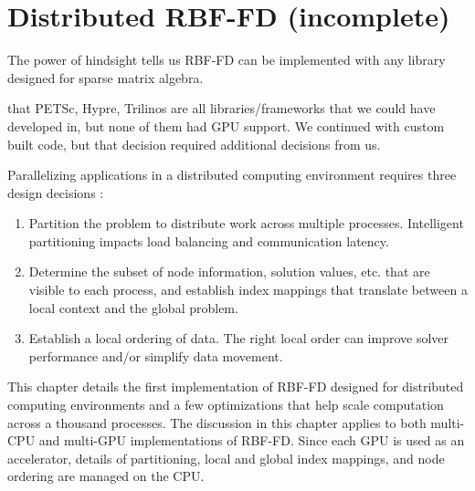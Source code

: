 \documentclass{report}
\begin{document}
\fi


\chapter{Distributed RBF-FD (incomplete)}
\label{chap:distributed_rbffd}



The power of hindsight tells us RBF-FD can be implemented with any library designed for sparse matrix algebra. 

 that PETSc, Hypre, Trilinos are all libraries/frameworks that we could have developed in, but none of them had GPU support. We continued with custom built code, but that decision required additional decisions from us. 

\cite{Yokota2010}
\cite{Yokota2012}
\cite{Schubert2011} 


Parallelizing applications in a distributed computing environment requires three
design decisions \cite{Saad2003}: 
\begin{enumerate} 
\item Partition the problem to distribute work across multiple processes. Intelligent partitioning
impacts load balancing and communication latency.
\item Determine the subset of node information,
solution values, etc. that are visible to each process, and establish index mappings that translate between a local context and the global problem. 
\item Establish a local ordering of data. The right local order can improve solver performance and/or simplify data movement. %
\end{enumerate}

This chapter details the first implementation of RBF-FD designed for distributed computing environments and a few optimizations that help scale computation across a thousand processes. The discussion in this chapter applies to both multi-CPU and multi-GPU implementations of RBF-FD. Since each GPU is used as an accelerator, details of partitioning, local and global index mappings, and node ordering are managed on the CPU.  
\end{document}
